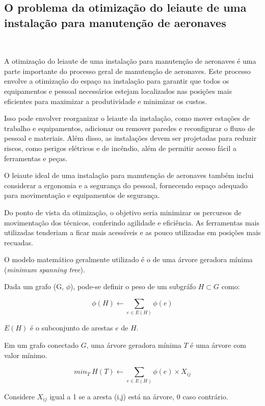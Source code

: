 \documentclass{amsart}
\begin{document}
\subsection{O problema da otimização do leiaute de uma instalação para manutenção de aeronaves}\

A otimização do leiaute de uma instalação para manutenção de aeronaves é uma parte importante do processo geral de manutenção de aeronaves. Este processo envolve a otimização do espaço na instalação para garantir que todos os equipamentos e pessoal necessários estejam localizados nas posições mais eficientes para maximizar a produtividade e minimizar os custos.

Isso pode envolver reorganizar o leiaute da instalação, como mover estações de trabalho e equipamentos, adicionar ou remover paredes e reconfigurar o fluxo de pessoal e materiais. Além disso, as instalações devem ser projetadas para reduzir riscos, como perigos elétricos e de incêndio, além de permitir acesso fácil a ferramentas e peças.

O leiaute ideal de uma instalação para manutenção de aeronaves também inclui considerar a ergonomia e a segurança do pessoal, fornecendo espaço adequado para movimentação e equipamentos de segurança.

Do ponto de vista da otimização, o objetivo seria minimizar os percursos de movimentação dos técnicos, conferindo agilidade e eficiência. As ferramentas mais utilizadas tenderiam a ficar mais acessíveis e as pouco utilizadas em posições mais recuadas.

O modelo matemático geralmente utilizado é o de uma árvore geradora mínima ({\it minimum spanning tree}).

Dada um grafo (G, $\phi$), pode-se definir o peso de um subgráfo $H \subset G$ como:

\begin{equation} \label{eq:fo1}
\phi(H) \gets \sum_{e \in E(H)} \phi (e)
\end{equation}

$E(H)$ é o subconjunto de arestas $e$ de $H$.

Em um grafo conectado $G$, uma árvore geradora mínima $T$ é uma árvore com valor mínimo.

\begin{equation} \label{eq:fo2}
min_T\ H(T) \gets \sum_{e \in E(H)} \phi (e) \times X_{ij}
\end{equation}


Considere $X_{ij}$ igual a 1 se a aresta (i,j) está na árvore, 0 caso contrário.
\end{document}
